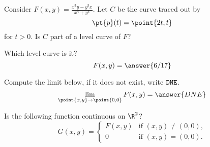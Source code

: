 \documentclass{ximera}
\author{Jim Talamo \and Bart Snapp}
\begin{document}
\begin{exercise}
  Consider $F(x,y) = \frac{x^3 y - y^3 x}{x^4+y^4}$. Let $C$ be the
  curve traced out by
  \[
  \pt{p}(t) = \point{2t,t}
  \]
  for $t> 0$. Is $C$  part of a level curve of $F$?
  \begin{multipleChoice}
  \end{multipleChoice}
  \begin{exercise}
    Which level curve is it?
    \[
    F(x,y) = \answer{6/17}
    \]
  \end{exercise}
  \begin{exercise}
    Compute the limit below, if it does not exist, write $\verb|DNE|$.
    \[
    \lim_{\point{x,y}\to \point{0,0}} F(x,y) = \answer{DNE}
    \]
  \end{exercise}
  \begin{exercise}
    Is the following function continuous on $\R^2$?
    \[
    G(x,y) =
    \begin{cases}
      F(x,y) &\text{if $(x,y)\ne (0,0)$},\\
      0 &\text{if $(x,y) = (0,0)$}.
    \end{cases}
    \]
    \begin{multipleChoice}
    \end{multipleChoice}
  \end{exercise}
\end{exercise}
\end{document}
